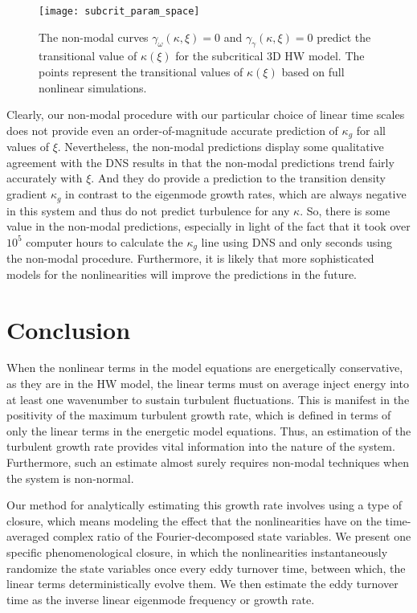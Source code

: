 \documentclass[twocolumn,showkeys,superscriptaddress]{revtex4}
\begin{document}
\begin{figure}
\centerline{\texttt{[image: subcrit\_param\_space]}}
\caption{The non-modal curves $\gamma_{\omega}(\kappa,\xi) = 0$ and $\gamma_{\gamma}(\kappa,\xi) = 0$ predict the transitional value of $\kappa(\xi)$ for the subcritical 3D HW model. The points represent the
transitional values of $\kappa(\xi)$ based on full nonlinear simulations.}
\label{subcrit_param_space}
\end{figure}

Clearly, our non-modal procedure with our particular choice of linear time scales does not provide even an order-of-magnitude accurate prediction of $\kappa_g$ for all values of $\xi$.
Nevertheless, the non-modal predictions display some qualitative agreement with the DNS results in that the non-modal predictions trend fairly accurately with $\xi$. 
And they do provide a prediction to the transition density gradient $\kappa_g$ in contrast to the eigenmode growth rates, which are always negative in this system and thus do not predict turbulence for any $\kappa$.
So, there is some value in the non-modal predictions, especially in light of the fact that it took over $10^5$ computer hours to calculate the $\kappa_g$ line using DNS and only seconds using the non-modal procedure.
Furthermore, it is likely that more sophisticated models for the nonlinearities will improve the predictions in the future.

\section{Conclusion}

When the nonlinear terms in the model equations are energetically conservative, as they are in the HW model, the linear terms must on average inject energy into at least one wavenumber to sustain turbulent fluctuations.
This is manifest in the positivity of the maximum turbulent growth rate, which is defined in terms of only the linear terms in the energetic model equations. Thus, an estimation of the turbulent growth rate provides vital
information into the nature of the system. Furthermore, such an estimate almost surely requires non-modal techniques when the system is non-normal. 

Our method for analytically estimating this growth rate involves using a type of closure, which means modeling the effect that the nonlinearities have
on the time-averaged complex ratio of the Fourier-decomposed state variables. 
We present one specific phenomenological closure, in which the nonlinearities instantaneously randomize the state variables once every eddy turnover time, between
which, the linear terms deterministically evolve them. We then estimate the eddy turnover time as the inverse linear eigenmode frequency or growth rate.
\end{document}

